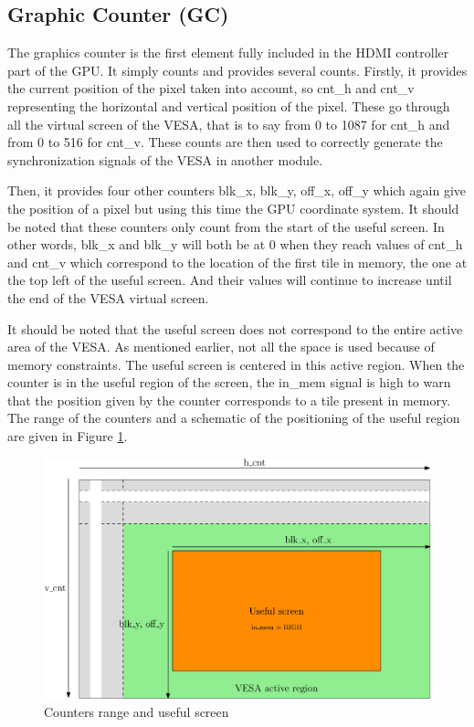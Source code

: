 \subsection{Graphic Counter (GC)}

The graphics counter is the first element fully included in the HDMI controller part of the GPU. 
It simply counts and provides several counts. Firstly, it provides the current position of the 
pixel taken into account, so cnt\_h and cnt\_v representing the horizontal and vertical position 
of the pixel. These go through all the virtual screen of the VESA, that is to say from 0 to 1087 
for cnt\_h and from 0 to 516 for cnt\_v. These counts are then used to correctly generate the 
synchronization signals of the VESA in another module. 

Then, it provides four other counters blk\_x, blk\_y, off\_x, off\_y which again give the position 
of a pixel but using this time the GPU coordinate system. It should be noted that these counters 
only count from the start of the useful screen. In other words, blk\_x and blk\_y will both be at 0 
when they reach values of cnt\_h and cnt\_v which correspond to the location of the first tile in 
memory, the one at the top left of the useful screen. And their values will continue to increase 
until the end of the VESA virtual screen.

It should be noted that the useful screen does not correspond to the entire active area of the 
VESA. As mentioned earlier, not all the space is used because of memory constraints. The useful 
screen is centered in this active region. When the counter is in the useful region of the screen, 
the in\_mem signal is high to warn that the position given by the counter corresponds to a tile 
present in memory. The range of the counters and a schematic of the positioning of the useful 
region are given in Figure \ref{fig:gpu/gc_screen}.

\begin{figure}[H]
    \centering
    \includegraphics[width=\linewidth]{Chapter4-GPU_CLKU/res/gc_screen}
    \caption{Counters range and useful screen}
    \label{fig:gpu/gc_screen}
\end{figure}

